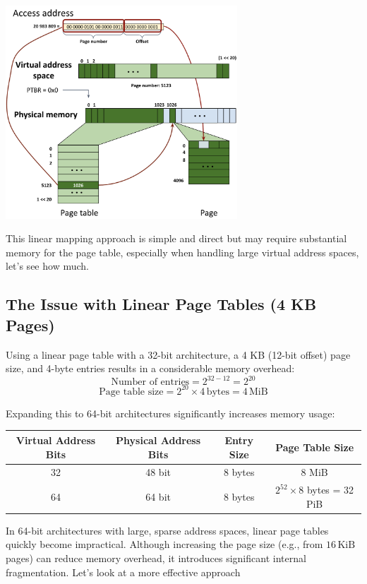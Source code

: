 \begin{center}
  \includegraphics[width=0.65\textwidth]{chapters/L5/images/resolving.png}
\end{center}

This linear mapping approach is simple and direct but may require substantial memory for the page table, especially when handling large virtual address spaces, let's see how much.

\subsection{The Issue with Linear Page Tables (4 KB Pages)}

Using a linear page table with a 32-bit architecture, a 4 KB (12-bit offset) page size, and 4-byte entries results in a considerable memory overhead:
\[
\text{Number of entries} = 2^{32 - 12} = 2^{20}
\]
\[
\text{Page table size} = 2^{20} \times 4\,\text{bytes} = 4\,\text{MiB}
\]

Expanding this to 64-bit architectures significantly increases memory usage:

\begin{center}
\small
\begin{tabular}{|c|c|c|c|}
\hline
\textbf{Virtual Address Bits} & \textbf{Physical Address Bits} & \textbf{Entry Size} & \textbf{Page Table Size} \\
\hline
32 & 48 bit & 8 bytes & 8 MiB \\
64 & 64 bit & 8 bytes & $2^{52} \times 8$ bytes = 32 PiB \\
\hline
\end{tabular}
\end{center}
\normalsize
In 64-bit architectures with large, sparse address spaces, linear page tables quickly become impractical. Although increasing the page size (e.g., from \(16\,\mathrm{KiB}\) pages) can reduce memory overhead, it introduces significant internal fragmentation. Let's look at a more effective approach
